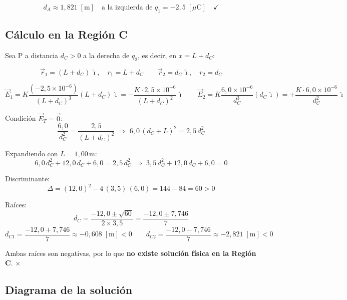 \documentclass[12pt,letterpaper]{article}
\begin{document}
\[
    \boxed{d_A \approx 1{,}821\;[\text{m}]
    \quad\text{a la izquierda de }q_1 = -2{,}5\;[\mu\text{C}]}
    \quad \checkmark
\]

\subsection*{C\'alculo en la Regi\'on C}

Sea P a distancia $d_C > 0$ a la derecha de $q_2$, es decir, en $x = L + d_C$:

\[
    \vec{r}_1 = (L+d_C)\,\hat{\imath},\quad r_1 = L+d_C \qquad
    \vec{r}_2 = d_C\,\hat{\imath},\quad r_2 = d_C
\]

\[
    \vec{E}_1 = K\frac{(-2{,}5\times10^{-6})}{(L+d_C)^3}(L+d_C)\,\hat{\imath}
    = -\frac{K\cdot2{,}5\times10^{-6}}{(L+d_C)^2}\,\hat{\imath}
    \qquad
    \vec{E}_2 = K\frac{6{,}0\times10^{-6}}{d_C^3}(d_C\,\hat{\imath})
    = +\frac{K\cdot6{,}0\times10^{-6}}{d_C^2}\,\hat{\imath}
\]

Condici\'on $\vec{E}_T = \vec{0}$:
\[
    \frac{6{,}0}{d_C^2} = \frac{2{,}5}{(L+d_C)^2}
    \;\Rightarrow\;
    6{,}0\,(d_C+L)^2 = 2{,}5\,d_C^2
\]

Expandiendo con $L = 1{,}00$\,m:
\[
    6{,}0\,d_C^2 + 12{,}0\,d_C + 6{,}0 = 2{,}5\,d_C^2
    \;\Rightarrow\;
    3{,}5\,d_C^2 + 12{,}0\,d_C + 6{,}0 = 0
\]

Discriminante:
\[
    \Delta = (12{,}0)^2 - 4\,(3{,}5)\,(6{,}0) = 144 - 84 = 60 > 0
\]

Ra\'ices:
\[
    d_C = \frac{-12{,}0 \pm \sqrt{60}}{2\times3{,}5}
    = \frac{-12{,}0 \pm 7{,}746}{7}
\]
\[
    d_{C1} = \frac{-12{,}0 + 7{,}746}{7} \approx -0{,}608\;[\text{m}] < 0
    \qquad
    d_{C2} = \frac{-12{,}0 - 7{,}746}{7} \approx -2{,}821\;[\text{m}] < 0
\]

Ambas ra\'ices son negativas, por lo que \textbf{no existe soluci\'on f\'isica en la
Regi\'on C}. $\times$

\subsection*{Diagrama de la soluci\'on}
\end{document}
